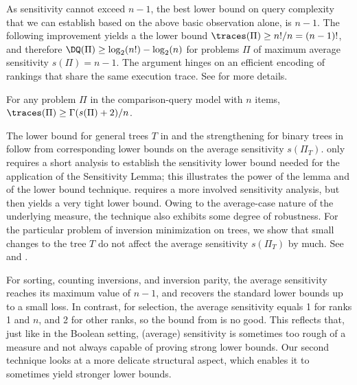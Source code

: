 \documentclass{toc}
\begin{document}
As sensitivity cannot exceed $n-1$, the best lower bound on query complexity that we can establish based on the above basic observation alone, is $n-1$. The following improvement yields a the lower bound $\traces(\Pi) \ge n!/n = (n-1)!$, and therefore $\DQ(\Pi) \ge \log_2(n!) - \log_2(n)$ for problems $\Pi$ of maximum average sensitivity $s(\Pi)=n-1$. The argument hinges on an efficient encoding of rankings that share the same execution trace. See  for more details.

\begin{lemma}\label{lemma:sensitivity}
For any problem $\Pi$ in the comparison-query model with $n$ items, $\traces(\Pi) \ge \Gamma(s(\Pi)+2)/n$. 
\end{lemma}

The lower bound for general trees $T$ in  and the strengthening for binary trees in  follow from corresponding lower bounds on the average sensitivity $s(\Pi_T)$.  only requires a short analysis to establish the sensitivity lower bound needed for the application of the Sensitivity Lemma; this illustrates the power of the lemma and of the lower bound technique.  requires a more involved sensitivity analysis, but then yields a very tight lower bound. Owing to the average-case nature of the underlying measure, the technique also exhibits some degree of robustness. For the particular problem of inversion minimization on trees, we show that small changes to the tree $T$ do not affect the average sensitivity $s(\Pi_T)$ by much. See  and .

For sorting, counting inversions, and inversion parity, the average sensitivity reaches its maximum value of $n-1$, and  recovers the standard lower bounds up to a small loss. In contrast, for selection, the average sensitivity equals 1 for ranks 1 and $n$, and 2 for other ranks, so the bound from  is no good. This reflects that, just like in the Boolean setting, (average) sensitivity is sometimes too rough of a measure and not always capable of proving strong lower bounds. Our second technique looks at a more delicate structural aspect, which enables it to sometimes yield stronger lower bounds. 
\end{document}
